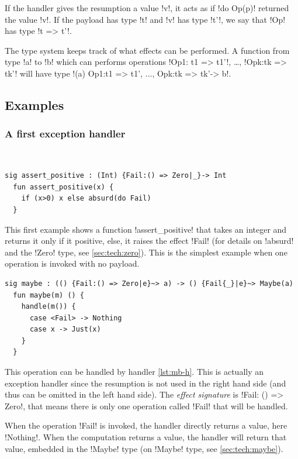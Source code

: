 \documentclass[10pt, nonacm=true, language=french, language=english]{acmart}
\begin{document}
If the handler gives the resumption a value !v!, it acts as if !do Op(p)! returned the value !v!. If the payload has type !t! and !v! has type !t'!, we say that !Op! has type !t => t'!.

The type system keeps track of what effects can be performed. A function from type !a! to !b! which can performs operations !Op1: t1 => t1'!, \dots, !Opk:tk => tk'! will have type !(a) {Op1:t1 => t1', ..., Opk:tk => tk'}-> b!.


\subsection{Examples}

\subsubsection{A first exception handler}
\label{sec:first-except-handl}

~

\begin{lstlisting}[caption=Fail invocation]
  sig assert_positive : (Int) {Fail:() => Zero|_}-> Int
  fun assert_positive(x) {
    if (x>0) x else absurd(do Fail)
  }
\end{lstlisting}

This first example shows a function !assert_positive! that takes an integer and returns it only if it positive, else, it raises the effect !Fail! (for details on !absurd! and the !Zero! type, see \ref{sec:tech:zero}). This is the simplest example when one operation is invoked with no payload.

\begin{lstlisting}[caption=maybe handler, label=lst:mb-h]
  sig maybe : (() {Fail:() => Zero|e}~> a) -> () {Fail{_}|e}~> Maybe(a)
  fun maybe(m) () {
    handle(m()) {
      case <Fail> -> Nothing
      case x -> Just(x)
    }
  }
\end{lstlisting}

This operation can be handled by handler \ref{lst:mb-h}. This is actually an exception handler since the resumption is not used in the right hand side (and thus can be omitted in the left hand side). The \emph{effect signature} is !{Fail: () => Zero}!, that means there is only one operation called !Fail! that will be handled.

When the operation !Fail! is invoked, the handler directly returns a value, here !Nothing!. When the computation returns a value, the handler will return that value, embedded in the !Maybe! type (on !Maybe! type, see \ref{sec:tech:maybe}).
\end{document}
